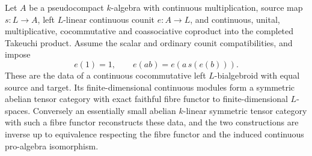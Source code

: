 \begin{theorem}\label{thm:corrected-pro-bialgebroid-reconstruction}
Let $A$ be a pseudocompact $k$-algebra with continuous multiplication,
source map $s:L\to A$, left $L$-linear continuous counit $e:A\to L$,
and continuous, unital, multiplicative, cocommutative and
coassociative coproduct into the completed Takeuchi product.
Assume the scalar and ordinary counit compatibilities, and impose
\[
                   e(1)=1,\qquad e(ab)=e(a\,s(e(b))).
\]
These are the data of a continuous cocommutative left
$L$-bialgebroid with equal source and target. Its finite-dimensional
continuous modules form a symmetric abelian tensor category with
exact faithful fibre functor to finite-dimensional $L$-spaces.
Conversely an essentially small abelian $k$-linear symmetric
tensor category with such a fibre functor reconstructs these data,
and the two constructions are inverse up to equivalence respecting
the fibre functor and the induced continuous pro-algebra isomorphism.
\end{theorem}
